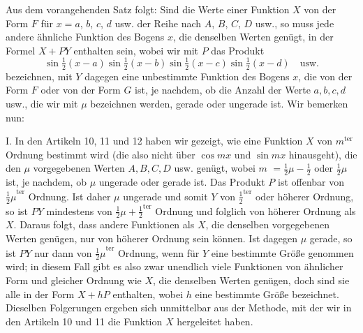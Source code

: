 \begingroup
\renewcommand{\arraystretch}{1.45}
Aus dem vorangehenden Satz folgt: Sind die Werte einer Funktion $X$ von der Form $F$ für $x=a$, $b$, $c$, $d$ usw. der Reihe nach $A$, $B$, $C$, $D$ usw., so muss jede andere ähnliche Funktion des Bogens $x$, die denselben Werten genügt, in der Formel $X+PY$ enthalten sein, wobei wir mit $P$ das Produkt
\[
\sin\tfrac12(x-a)\sin\tfrac12(x-b)\sin\tfrac12(x-c)\sin\tfrac12(x-d)\quad\text{usw.}
\]
bezeichnen, mit $Y$ dagegen eine unbestimmte Funktion des Bogens $x$, die von der Form $F$ oder von der Form
\(G\) ist, je nachdem, ob die Anzahl der Werte \(a,b,c,d\) usw., die wir mit \(\mu\) bezeichnen werden, gerade oder ungerade ist. Wir bemerken nun:

I. In den Artikeln 10, 11 und 12 haben wir gezeigt, wie eine Funktion \(X\) von \(m^{\mathrm{ter}}\) Ordnung bestimmt wird (die also nicht über \(\cos mx\) und \(\sin mx\) hinausgeht), die den \(\mu\) vorgegebenen Werten \(A,B,C,D\) usw. genügt, wobei \(m\) \(=\frac{1}{2}\mu-\frac{1}{2}\) oder \(\frac{1}{2}\mu\) ist, je nachdem, ob \(\mu\) ungerade oder gerade ist. Das Produkt \(P\) ist offenbar von \({\frac{1}{2}\mu}^{\mathrm{ter}}\) Ordnung. Ist daher \(\mu\) ungerade und somit \(Y\) von \({\frac{1}{2}}^{\mathrm{ter}}\) oder höherer Ordnung, so ist \(PY\) mindestens von \({\frac{1}{2}\mu+\frac{1}{2}}^{\mathrm{ter}}\) Ordnung und folglich von höherer Ordnung als \(X\). Daraus folgt, dass andere Funktionen als \(X\), die denselben vorgegebenen Werten genügen, nur von höherer Ordnung sein können. Ist dagegen \(\mu\) gerade, so ist \(PY\) nur dann von \({\frac{1}{2}\mu}^{\mathrm{ter}}\) Ordnung, wenn für \(Y\) eine bestimmte Größe genommen wird; in diesem Fall gibt es also zwar unendlich viele Funktionen von ähnlicher Form und gleicher Ordnung wie \(X\), die denselben Werten genügen, doch sind sie alle in der Form \(X+hP\) enthalten, wobei \(h\) eine bestimmte Größe bezeichnet. Dieselben Folgerungen ergeben sich unmittelbar aus der Methode, mit der wir in den Artikeln 10 und 11 die Funktion \(X\) hergeleitet haben.

